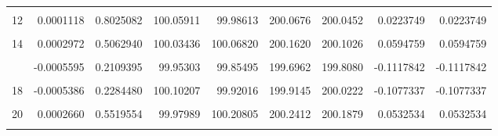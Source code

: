 \documentclass[a4paper]{tufte-handout}
\begin{document}
\begin{table}
{\begin{tabular}[t]{rrrrrrrrr}
\addlinespace
\cellcolor{gray!6}{11} & \cellcolor{gray!6}{0.0007520} & \cellcolor{gray!6}{0.0926401} & \cellcolor{gray!6}{99.92396} & \cellcolor{gray!6}{99.98816} & \cellcolor{gray!6}{200.0625} & \cellcolor{gray!6}{199.9121} & \cellcolor{gray!6}{0.1503437} & \cellcolor{gray!6}{0.1503437}\\
12 & 0.0001118 & 0.8025082 & 100.05911 & 99.98613 & 200.0676 & 200.0452 & 0.0223749 & 0.0223749\\
\cellcolor{gray!6}{13} & \cellcolor{gray!6}{-0.0002818} & \cellcolor{gray!6}{0.5286018} & \cellcolor{gray!6}{100.01455} & \cellcolor{gray!6}{99.94620} & \cellcolor{gray!6}{199.9044} & \cellcolor{gray!6}{199.9608} & \cellcolor{gray!6}{-0.0563506} & \cellcolor{gray!6}{-0.0563506}\\
14 & 0.0002972 & 0.5062940 & 100.03436 & 100.06820 & 200.1620 & 200.1026 & 0.0594759 & 0.0594759\\
\cellcolor{gray!6}{15} & \cellcolor{gray!6}{-0.0003046} & \cellcolor{gray!6}{0.4958450} & \cellcolor{gray!6}{99.96929} & \cellcolor{gray!6}{100.08177} & \cellcolor{gray!6}{199.9901} & \cellcolor{gray!6}{200.0511} & \cellcolor{gray!6}{-0.0609298} & \cellcolor{gray!6}{-0.0609298}\\
\addlinespace
16 & -0.0005595 & 0.2109395 & 99.95303 & 99.85495 & 199.6962 & 199.8080 & -0.1117842 & -0.1117842\\
\cellcolor{gray!6}{17} & \cellcolor{gray!6}{0.0000517} & \cellcolor{gray!6}{0.9080509} & \cellcolor{gray!6}{99.94353} & \cellcolor{gray!6}{99.91597} & \cellcolor{gray!6}{199.8698} & \cellcolor{gray!6}{199.8595} & \cellcolor{gray!6}{0.0103231} & \cellcolor{gray!6}{0.0103231}\\
18 & -0.0005386 & 0.2284480 & 100.10207 & 99.92016 & 199.9145 & 200.0222 & -0.1077337 & -0.1077337\\
\cellcolor{gray!6}{19} & \cellcolor{gray!6}{0.0003708} & \cellcolor{gray!6}{0.4070281} & \cellcolor{gray!6}{99.99910} & \cellcolor{gray!6}{99.94069} & \cellcolor{gray!6}{200.0139} & \cellcolor{gray!6}{199.9398} & \cellcolor{gray!6}{0.0741378} & \cellcolor{gray!6}{0.0741378}\\
20 & 0.0002660 & 0.5519554 & 99.97989 & 100.20805 & 200.2412 & 200.1879 & 0.0532534 & 0.0532534\\
\addlinespace
\cellcolor{gray!6}{21} & \cellcolor{gray!6}{0.0001940} & \cellcolor{gray!6}{0.6644167} & \cellcolor{gray!6}{99.95954} & \cellcolor{gray!6}{100.07311} & \cellcolor{gray!6}{200.0715} & \cellcolor{gray!6}{200.0326} & \cellcolor{gray!6}{0.0388087} & \cellcolor{gray!6}{0.0388087}\\

\end{tabular}}
\end{table}
\end{document}

